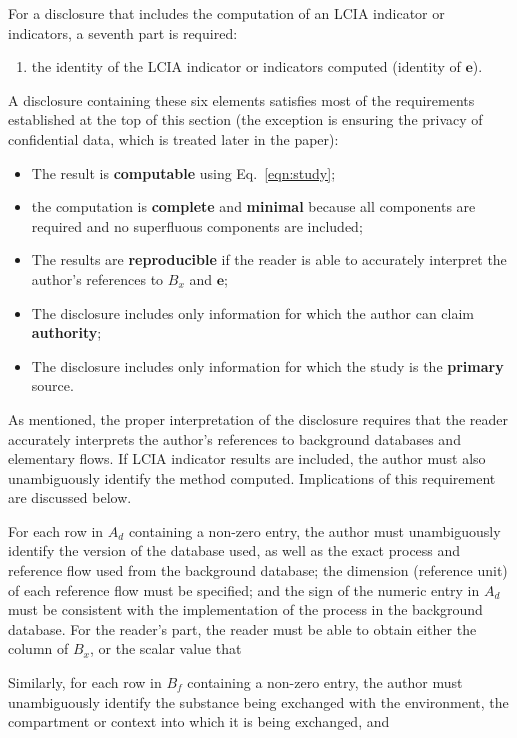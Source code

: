 For a disclosure that includes the computation of an LCIA indicator or indicators, a seventh part is required:
\begin{enumerate}[resume]
\item the identity of the LCIA indicator or indicators computed (identity of $\mathbf{e}$).
\end{enumerate}

A disclosure containing these six elements satisfies most of the requirements established at the top of this section (the exception is ensuring the privacy of confidential data, which is treated later in the paper):
\begin{itemize}
  \item The result is \textbf{computable} using Eq.~\ref{eqn:study};
  \item the computation is \textbf{complete} and \textbf{minimal} because all components are required and no superfluous components are included;
  \item The results are \textbf{reproducible} if the reader is able to accurately interpret the author's references to $B_x$ and $\mathbf{e}$;
  \item The disclosure includes only information for which the author can claim \textbf{authority};
  \item The disclosure includes only information for which the study is the \textbf{primary} source.
\end{itemize}
As mentioned, the proper interpretation of the disclosure requires that the reader accurately interprets the author's references to background databases and elementary flows.  If LCIA indicator results are included, the author must also unambiguously identify the method computed.  Implications of this requirement are discussed below.



For each row in $A_d$ containing a non-zero entry, the author must unambiguously identify the version of the database used, as well as the exact process and reference flow used from the background database; the dimension (reference unit) of each reference flow must be specified; and the sign of the numeric entry in $A_d$ must be consistent with the implementation of the process in the background database.  For the reader's part, the reader must be able to obtain either the column of $B_x$, or the scalar value that 

Similarly, for each row in $B_f$ containing a non-zero entry, the author must unambiguously identify the substance being exchanged with the environment, the compartment or context into which it is being exchanged, and 



